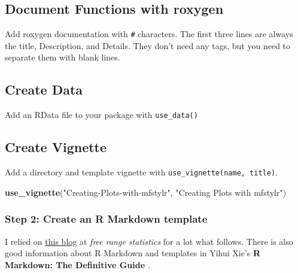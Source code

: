 \documentclass[
]{book}
\newenvironment{Shaded}{\begin{snugshade}}{\end{snugshade}}
\newcommand{\KeywordTok}[1]{\textcolor[rgb]{0.13,0.29,0.53}{\textbf{#1}}}
\newcommand{\NormalTok}[1]{#1}
\newcommand{\StringTok}[1]{\textcolor[rgb]{0.31,0.60,0.02}{#1}}
\begin{document}
\hypertarget{document-functions-with-roxygen}{%
\subsection{Document Functions with roxygen}\label{document-functions-with-roxygen}}

Add roxygen documentation with \texttt{\#\textquotesingle{}} characters. The first three lines are always the title, Description, and Details. They don't need any tags, but you need to separate them with blank lines.

\hypertarget{create-data}{%
\subsection*{Create Data}\label{create-data}}

Add an RData file to your package with \texttt{use\_data()}

\hypertarget{create-vignette}{%
\subsection*{Create Vignette}\label{create-vignette}}

Add a directory and template vignette with \texttt{use\_vignette(name,\ title)}.

\begin{Shaded}
\begin{Highlighting}[]
\KeywordTok{use_vignette}\NormalTok{(}\StringTok{"Creating-Plots-with-mfstylr"}\NormalTok{, }\StringTok{"Creating Plots with mfstylr"}\NormalTok{)}
\end{Highlighting}
\end{Shaded}

\hypertarget{step-2-create-an-r-markdown-template}{%
\subsubsection*{Step 2: Create an R Markdown template}\label{step-2-create-an-r-markdown-template}}

I relied on \href{http://freerangestats.info/blog/2017/09/09/rmarkdown}{this blog} at \emph{free range statistics} for a lot what follows. There is also good information about R Markdown and templates in Yihui Xie's \textbf{R Markdown: The Definitive Guide} \citep{Xie2019b}.
\end{document}
